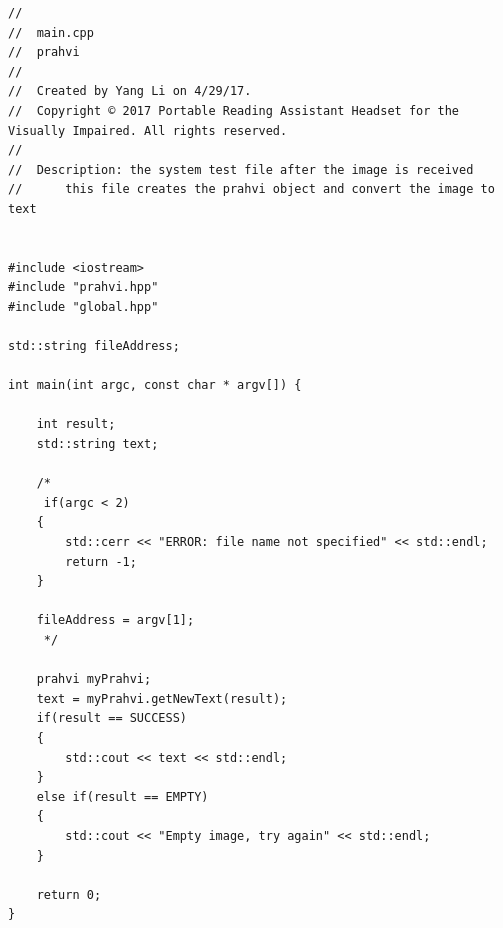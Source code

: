 \begin{lstlisting}
//
//  main.cpp
//  prahvi
//
//  Created by Yang Li on 4/29/17.
//  Copyright © 2017 Portable Reading Assistant Headset for the Visually Impaired. All rights reserved.
//
//	Description: the system test file after the image is received
//		this file creates the prahvi object and convert the image to text


#include <iostream>
#include "prahvi.hpp"
#include "global.hpp"

std::string fileAddress;

int main(int argc, const char * argv[]) {
	
	int result;
	std::string text;
	
	/*
	 if(argc < 2)
	{
		std::cerr << "ERROR: file name not specified" << std::endl;
		return -1;
	}
	
	fileAddress = argv[1];
	 */
	
	prahvi myPrahvi;
	text = myPrahvi.getNewText(result);
	if(result == SUCCESS)
	{
		std::cout << text << std::endl;
	}
	else if(result == EMPTY)
	{
		std::cout << "Empty image, try again" << std::endl;
	}
	
	return 0;
}

\end{lstlisting}

